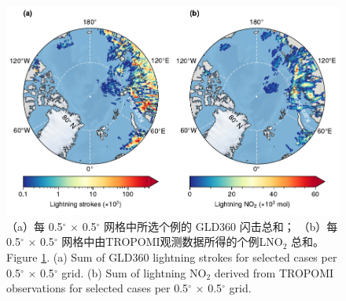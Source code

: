 \begin{figure}[!htbp]
\centering
\includegraphics[width=13cm]{./figures/arctic_lno2_production.pdf}
\caption{
（a）每 0.5$^{\circ}$ $\times$ 0.5$^{\circ}$ 网格中所选个例的 GLD360 闪击总和；
（b）每 0.5$^{\circ}$ $\times$ 0.5$^{\circ}$ 网格中由TROPOMI观测数据所得的个例LNO$_2$ 总和。\\
Figure \ref{fig:arctic_lno2_production}. (a) Sum of GLD360 lightning strokes for selected cases per 0.5$^{\circ}$ $\times$ 0.5$^{\circ}$ grid.
(b) Sum of lightning NO$_2$ derived from TROPOMI observations for selected cases per 0.5$^{\circ}$ $\times$ 0.5$^{\circ}$ grid.
}
\label{fig:arctic_lno2_production}
\end{figure}

